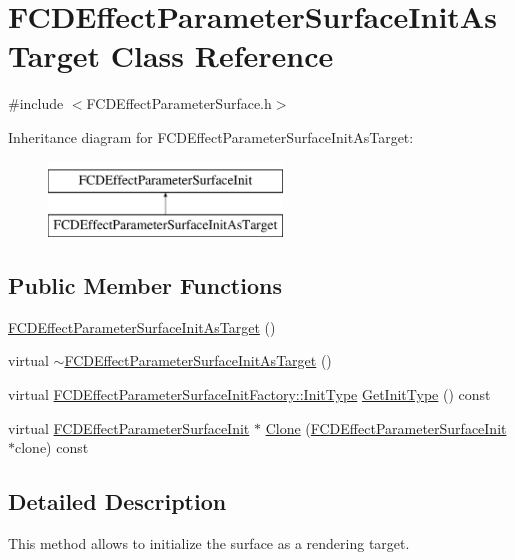 \hypertarget{classFCDEffectParameterSurfaceInitAsTarget}{
\section{FCDEffectParameterSurfaceInitAsTarget Class Reference}
\label{classFCDEffectParameterSurfaceInitAsTarget}
}


{\ttfamily \#include $<$FCDEffectParameterSurface.h$>$}

Inheritance diagram for FCDEffectParameterSurfaceInitAsTarget:\begin{figure}[H]
\begin{center}
\leavevmode
\includegraphics[height=2.000000cm]{classFCDEffectParameterSurfaceInitAsTarget}
\end{center}
\end{figure}
\subsection*{Public Member Functions}
\begin{DoxyCompactItemize}
\item 
\hyperlink{classFCDEffectParameterSurfaceInitAsTarget_ac376d8e70a47b5e755dd658e79fff8fb}{FCDEffectParameterSurfaceInitAsTarget} ()
\item 
virtual \hyperlink{classFCDEffectParameterSurfaceInitAsTarget_a0370bc803fc43b77113a38ecbc898ea3}{$\sim$FCDEffectParameterSurfaceInitAsTarget} ()
\item 
virtual \hyperlink{classFCDEffectParameterSurfaceInitFactory_a65e74f1159865702cac5236dd5d83892}{FCDEffectParameterSurfaceInitFactory::InitType} \hyperlink{classFCDEffectParameterSurfaceInitAsTarget_a45bcad832e5dd14719aa1dfbea529db2}{GetInitType} () const 
\item 
virtual \hyperlink{classFCDEffectParameterSurfaceInit}{FCDEffectParameterSurfaceInit} $\ast$ \hyperlink{classFCDEffectParameterSurfaceInitAsTarget_aa4c94c80a32fa40d6c7cc851d73b105e}{Clone} (\hyperlink{classFCDEffectParameterSurfaceInit}{FCDEffectParameterSurfaceInit} $\ast$clone) const 
\end{DoxyCompactItemize}


\subsection{Detailed Description}
This method allows to initialize the surface as a rendering target. 

